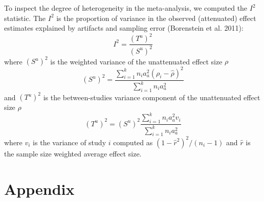 \documentclass{article}
\begin{document}
To inspect the degree of heterogeneity in the meta-analysis, we computed the $I^2$ statistic. The $I^2$ is the proportion of variance in the observed (attenuated) effect estimates explained by artifacts and sampling error (Borenstein et al. 2011): 
%
\begin{equation}
\label{eq:i2_statistic}
I^2 = \frac{(T^u)^2}{(S^u)^2}
\end{equation}
%
where $(S^u)^2$ is the weighted variance of the unattenuated effect size $\rho$
%
\begin{equation}
\label{eq:Su2_var}
(S^u)^2 = \frac{\sum_{i=1}^k n_i a_a^2 (\rho_i - \hat{\rho})^2}{\sum_{i=1}^k n_i a_a^2}
\end{equation}
%
and $(T^u)^2$ is the between-studies variance component of the unattenuated effect size $\rho$
%
\begin{equation}
\label{eq:Tu2_var}
(T^u)^2 = (S^u)^2 \frac{\sum_{i=1}^k n_i a_a^2 v_i}{\sum_{i=1}^k n_i a_a^2}
\end{equation}
%
where $v_i$ is the variance of study $i$ computed as $(1 - \hat{r}^2)^2 / (n_i - 1)$ and $\hat{r}$ is the sample size weighted average effect size.










\section{Appendix}
\label{appendix}



\clearpage


% 


% 
\end{document}
